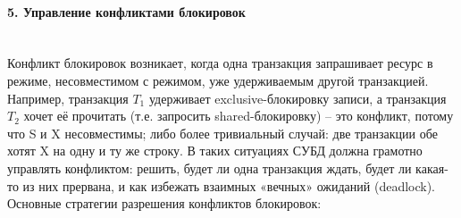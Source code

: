 \paragraph{5. Управление конфликтами блокировок} ~\\
 Конфликт блокировок возникает, когда одна транзакция запрашивает ресурс в режиме, несовместимом с режимом, уже удерживаемым другой транзакцией. Например, транзакция $T_1$ удерживает exclusive-блокировку записи, а транзакция $T_2$ хочет её прочитать (т.е. запросить shared-блокировку) – это конфликт, потому что S и X несовместимы; либо более тривиальный случай: две транзакции обе хотят X на одну и ту же строку. В таких ситуациях СУБД должна грамотно управлять конфликтом: решить, будет ли одна транзакция ждать, будет ли какая-то из них прервана, и как избежать взаимных «вечных» ожиданий (deadlock). Основные стратегии разрешения конфликтов блокировок:

